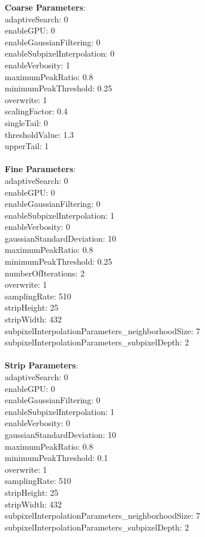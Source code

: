 \documentclass[11pt]{article}
\begin{document}
\textbf{Coarse Parameters}: \\
adaptiveSearch: 0\\
enableGPU: 0\\
enableGaussianFiltering: 0\\
enableSubpixelInterpolation: 0\\
enableVerbosity: 1\\
maximumPeakRatio: 0.8\\
minimumPeakThreshold: 0.25\\
overwrite: 1\\
scalingFactor: 0.4\\
singleTail: 0\\
thresholdValue: 1.3\\
upperTail: 1\\
\\
\textbf{Fine Parameters}: \\
adaptiveSearch: 0\\
enableGPU: 0\\
enableGaussianFiltering: 0\\
enableSubpixelInterpolation: 1\\
enableVerbosity: 0\\
gaussianStandardDeviation: 10\\
maximumPeakRatio: 0.8\\
minimumPeakThreshold: 0.25\\
numberOfIterations: 2\\
overwrite: 1\\
samplingRate: 510\\
stripHeight: 25\\
stripWidth: 432\\
subpixelInterpolationParameters\_neighborhoodSize: 7\\
subpixelInterpolationParameters\_subpixelDepth: 2\\
\\
\textbf{Strip Parameters}: \\
adaptiveSearch: 0\\
enableGPU: 0\\
enableGaussianFiltering: 0\\
enableSubpixelInterpolation: 1\\
enableVerbosity: 0\\
gaussianStandardDeviation: 10\\
maximumPeakRatio: 0.8\\
minimumPeakThreshold: 0.1\\
overwrite: 1\\
samplingRate: 510\\
stripHeight: 25\\
stripWidth: 432\\
subpixelInterpolationParameters\_neighborhoodSize: 7\\
subpixelInterpolationParameters\_subpixelDepth: 2\\
\\
\newpage
\end{document}
